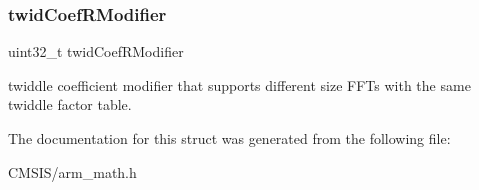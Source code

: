 \subsubsection{\texorpdfstring{twidCoefRModifier}{twidCoefRModifier}}
{\footnotesize\ttfamily uint32\+\_\+t twid\+Coef\+R\+Modifier}

twiddle coefficient modifier that supports different size F\+F\+Ts with the same twiddle factor table. 

The documentation for this struct was generated from the following file\+:\begin{DoxyCompactItemize}
\item 
C\+M\+S\+I\+S/arm\+\_\+math.\+h\end{DoxyCompactItemize}
